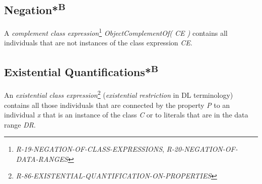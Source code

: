 \documentclass{llncs}
\begin{document}
\subsection{Negation*\textsuperscript{B}}

A \emph{complement class expression}\footnote{\emph{R-19-NEGATION-OF-CLASS-EXPRESSIONS}, \emph{R-20-NEGATION-OF-DATA-RANGES}} \emph{ObjectComplementOf( CE )} contains all individuals that are not instances of the class expression \emph{CE}. 

\subsection{Existential Quantifications*\textsuperscript{B}}

An \emph{existential class expression}\footnote{{\em R-86-EXISTENTIAL-QUANTIFICATION-ON-PROPERTIES}} ({\em existential restriction} in DL terminology) contains all those individuals that are connected by the property \emph{P} to an individual \emph{x} that is an instance of the class \emph{C} or to literals that are in the data range \emph{DR}.
\end{document}
